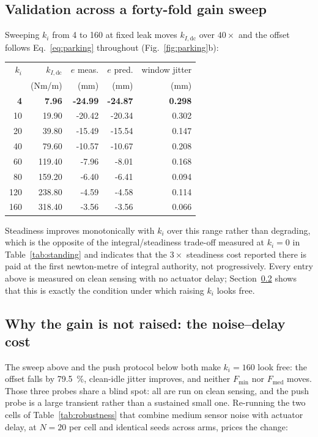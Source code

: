 \documentclass[a4paper,fleqn]{cas-dc}
\begin{document}
\subsection{Validation across a forty-fold gain sweep}

Sweeping $k_i$ from \num{4} to \num{160} at fixed leak moves $k_{I,\text{dc}}$
over $40{\times}$ and the offset follows Eq.~\eqref{eq:parking} throughout
(Fig.~\ref{fig:parking}b):

\begin{center}\footnotesize
\begin{tabular}{rrrrr}
\hline
$k_i$ & $k_{I,\text{dc}}$ & $e$ meas. & $e$ pred. & window jitter \\
 & (Nm/m) & (mm) & (mm) & (mm) \\
\hline
\textbf{4} & \textbf{7.96} & \textbf{-24.99} & \textbf{-24.87} & \textbf{0.298} \\
10 & 19.90 & -20.42 & -20.34 & 0.302 \\
20 & 39.80 & -15.49 & -15.54 & 0.147 \\
40 & 79.60 & -10.57 & -10.67 & 0.208 \\
60 & 119.40 & -7.96 & -8.01 & 0.168 \\
80 & 159.20 & -6.40 & -6.41 & 0.094 \\
120 & 238.80 & -4.59 & -4.58 & 0.114 \\
160 & 318.40 & -3.56 & -3.56 & 0.066 \\
\hline
\end{tabular}
\end{center}

Steadiness improves monotonically with $k_i$ over this range rather than
degrading, which is the opposite of the integral/steadiness trade-off measured
at $k_i{=}0$ in Table~\ref{tab:standing} and indicates that the $3{\times}$
steadiness cost reported there is paid at the first newton-metre of integral
authority, not progressively. Every entry above is measured on clean sensing
with no actuator delay; Section~\ref{sec:parking_ki_cost} shows that this is exactly
the condition under which raising $k_i$ looks free.

\subsection{Why the gain is not raised: the noise--delay cost}
\label{sec:parking_ki_cost}

The sweep above and the push protocol below both make $k_i{=}160$ look free:
the offset falls by \SI{79.5}{\percent}, clean-idle jitter improves, and
neither $F_{\min}$ nor $F_{\text{med}}$ moves. Those three probes share a blind spot: all are run on clean sensing, and the push probe is a large
transient rather than a sustained small one. Re-running the two cells of
Table~\ref{tab:robustness} that combine medium sensor noise with actuator
delay, at $N{=}20$ per cell and identical seeds across arms, prices the change:
\end{document}
